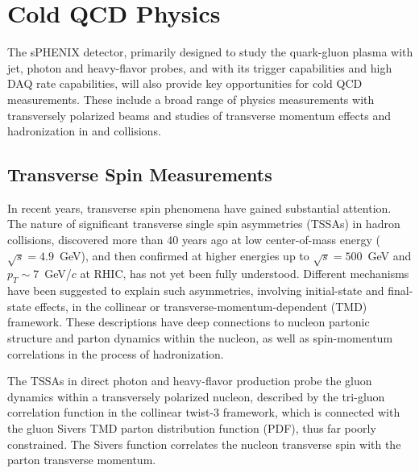 \section{Cold QCD Physics}
\label{sec:ColdQCD}

The sPHENIX detector, primarily designed to study the quark-gluon plasma with jet, photon and
heavy-flavor probes, and with its trigger capabilities and high DAQ
rate capabilities, will also provide key opportunities for cold QCD
measurements. These include a broad range of physics measurements with
transversely polarized beams and studies of transverse momentum
effects and hadronization in \pp and \pA collisions.   


\subsection {Transverse Spin Measurements}

In recent years, transverse spin phenomena have gained substantial
attention. The nature of significant transverse single spin
asymmetries (TSSAs) in hadron collisions, discovered more than 40
years ago at low center-of-mass energy ($\sqrt{s}=4.9$~GeV), and then
confirmed at higher energies up to $\sqrt{s}=500$~GeV and $p_T \sim
7$~GeV/$c$ at RHIC, has not yet been fully understood. Different
mechanisms have been suggested to explain such asymmetries, involving
initial-state and final-state effects, in the collinear or
transverse-momentum-dependent (TMD) framework. These descriptions have
deep connections to nucleon partonic structure and parton dynamics
within the nucleon, as well as spin-momentum correlations in the
process of hadronization. 

The TSSAs in direct photon and heavy-flavor production probe the gluon
dynamics within a transversely polarized nucleon, described by the
tri-gluon correlation function in the collinear twist-3 framework,
which is connected with the gluon Sivers TMD parton distribution
function (PDF), thus far poorly constrained. The Sivers function
correlates the nucleon transverse spin with the parton transverse
momentum. 

